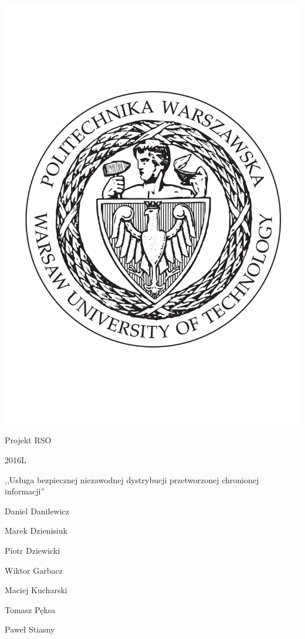 \documentclass[11pt,twocolumn]{article}
\title{}
\author{
  Daniel Danilewicz \\
  Maciej Kucharski \\
  Marek Dzienisiuk \\
  Paweł Stiasny (kierownik) \\
  Piotr Dziewicki \\
  Tomasz Pęksa \\
  Wiktor Garbacz \\
}
\begin{document}
\begin{titlepage}
  \centering
  \includegraphics[scale=0.3]{logopw.pdf} \par
  \vspace{0.5cm}

  {\Large Projekt RSO \par 2016L \par}
  \vspace{1cm}
  {\LARGE ,,Usługa bezpiecznej niezawodnej dystrybucji przetworzonej chronionej
          informacji'' \par}

  \vspace{2cm}

  Daniel Danilewicz \par
  Marek Dzienisiuk \par
  Piotr Dziewicki \par
  Wiktor Garbacz \par
  Maciej Kucharski \par
  Tomasz Pęksa \par
  Paweł Stiasny \par

  \vfill
\end{titlepage}
\end{document}
